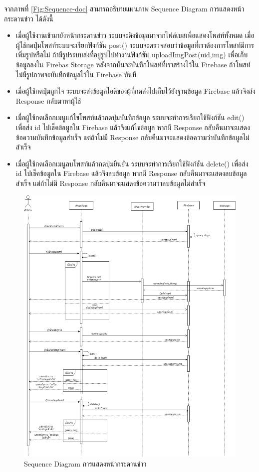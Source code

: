 	จากภาพที่ \ref{Fig:Sequence-doc} สามารถอธิบายแผนภาพ Sequence Diagram การแสดงหน้ากระดานข่าว ได้ดังนี้ 
	\begin{itemize}
	\item เมื่อผู้ใช้งานเข้ามายังหน้ากระดานข่าว ระบบจะดึงข้อมูลมาจากไฟล์เบสเพื่อแสดงโพสท์ทั้งหมด เมื่อผู้ใช้กดปุ่มโพสท์ระบบจะเรียกฟังก์ชัน post() 
	ระบบจะตรวจสอบว่าข้อมูลที่เราต้องการโพสท์มีการเพิ่มรูปหรือไม่ ถ้ามีรูประบบส่งที่อยู่รูปไปทำงานฟังก์ชัน uploadImgPost(uid,img) 
	เพื่อเก็บข้อมูลลงใน Firebas Storage หลังจากนั้นจะบันทึกโพสท์ที่เราสร้างไว้ใน Firebase ถ้าโพสท์ไม่มีรูปภาพจะบันทึกข้อมูลไว้ใน Firebase ทันที 
	\item เมื่อผู้ใช้กดปุ่มถูกใจ ระบบจะส่งข้อมูลไอดีของผู้ที่กดส่งไปเก็บไว้ยังฐานข้อมูล Firebase แล้วจึงส่ง Response กลับมาหาผู้ใช้
	\item เมื่อผู้ใช้กดเลือกเมนูแก้ไขโพสท์แล้วกดปุ่มบันทึกข้อมูล ระบบจะทำการเรียกใช้ฟังก์ชัน edit() เพื่อส่ง id ไปเช็คข้อมูลใน Firebase แล้วจึงแก้ไขข้อมูล หากมี Response กลับคืนมาจะแสดงข้อความบันทึกข้อมูลสำเร็จ แต่ถ้าไม่มี Response กลับคืนมาจะแสดงข้อความว่าบันทึกข้อมูลไม่สำเร็จ
	\item เมื่อผู้ใช้กดเลือกเมนูลบโพสท์แล้วกดปุ่มยืนยัน ระบบจะทำการเรียกใช้ฟังก์ชัน delete() เพื่อส่ง id ไปเช็คข้อมูลใน Firebase แล้วจึงลบข้อมูล หากมี Response กลับคืนมาจะแสดงลบข้อมูลสำเร็จ แต่ถ้าไม่มี Response กลับคืนมาจะแสดงข้อความว่าลบข้อมูลไม่สำเร็จ
	\end{itemize}
	\newpage	
	\begin{figure}[H]
		\centering
		\includegraphics[width=1.0\columnwidth]
		{Figures/3/Sequence/feed}
		\caption{Sequence Diagram การแสดงหน้ากระดานข่าว}
		\label{Fig:Sequence-feed}
	\end{figure}
	\newpage

